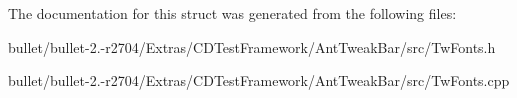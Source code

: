 The documentation for this struct was generated from the following files\+:\begin{DoxyCompactItemize}
\item 
bullet/bullet-\/2.-\/r2704/\+Extras/\+C\+D\+Test\+Framework/\+Ant\+Tweak\+Bar/src/Tw\+Fonts.\+h\item 
bullet/bullet-\/2.-\/r2704/\+Extras/\+C\+D\+Test\+Framework/\+Ant\+Tweak\+Bar/src/Tw\+Fonts.\+cpp\end{DoxyCompactItemize}
